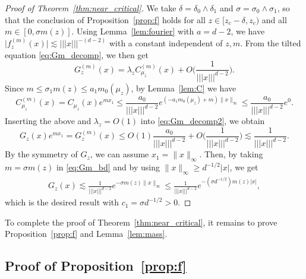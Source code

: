 \documentclass[11pt,hidelinks]{article}
\theoremstyle{plain}
\numberwithin{equation}{section}
\renewcommand{\(}{\left(}
\renewcommand{\)}{\right)}
\newcommand{\1}{\mathds{1}}
\providecommand{\abs}[1]{\lvert#1\rvert}
\providecommand{\norm}[1]{\lVert#1\rVert}
\newcommand{\mz}{m(z)}
\newcommand{\muz}{{\mu_z}}
\newcommand{\supm}{^{(m)}}
\newcommand{\veee}[1]{|\!|\!|#1|\!|\!|}
\providecommand{\nnnorm}[1]{\veee {#1} }
\begin{document}
\begin{proof}[Proof of Theorem~\ref{thm:near_critical}]
We take $\delta = \delta_0 \wedge \delta_1$ and 
$\sigma = \sigma_0 \wedge \sigma_1$,
so that the conclusion of Proposition~\ref{prop:f} holds for all $z \in [z_c - \delta, z_c)$ and all $ m \in [0, \sigma m(z)]$. 
Using Lemma~\ref{lem:fourier} with $a = d-2$, we have $\abs{ f_z\supm(x) } \lesssim \nnnorm x^{-(d-2)}$ with a constant independent of $z,m$. 
From the tilted equation \eqref{eq:Gm_decomp}, we then get
\begin{equation} \label{eq:Gm_decomp2}
G_z\supm(x) = \lambda_z C_\muz\supm(x) + O\bigg( \frac 1 { \nnnorm x^{d-2} } \bigg). 
\end{equation}
Since $m \le \sigma_1 \mz \le a_1 m_0(\muz)$, by Lemma~\ref{lem:C} we have
\begin{equation}
C_\muz\supm(x) = C_\muz(x) e^{mx_1}
\le \frac{ a_0 }{ \nnnorm x^{d-2} } e^{ (-a_1 m_0(\muz) + m) \norm x _ \infty} 
\le \frac{ a_0 }{ \nnnorm x^{d-2} } e^0. 
\end{equation}
Inserting the above and $\lambda_z = O(1)$ into \eqref{eq:Gm_decomp2},
we obtain
\begin{equation} \label{eq:Gm_bd}
G_z(x) e^{mx_1}  = G_z\supm(x) 
\le  O(1) \frac{ a_0 }{ \nnnorm x^{d-2} } + O\bigg( \frac 1 { \nnnorm x^{d-2} } \bigg)
\lesssim \frac 1 {\nnnorm x^{d-2}}.
\end{equation}
By the symmetry of $G_z$, we can assume $x_1 = \norm x_\infty$.
Then, by taking $m=\sigma \mz$ in \eqref{eq:Gm_bd} and by using $\norm x_\infty \ge d^{-1/2} \abs x$, we get
\begin{align}
G_z(x) \lesssim \frac{ 1 }{ \nnnorm x^{d-2} } e^{- \sigma\mz \norm x_\infty}
\le \frac{ 1 }{ \nnnorm x^{d-2} } e^{- (\sigma d^{-1/2} ) \mz \abs x},
\end{align}
which is the desired result with $c_1 = \sigma d^{-1/2}  > 0$. 
\end{proof}

To complete the proof of Theorem~\ref{thm:near_critical},
it remains to prove Proposition~\ref{prop:f} and Lemma~\ref{lem:mass}. 




\subsection{Proof of Proposition~\ref{prop:f}}
\end{document}
